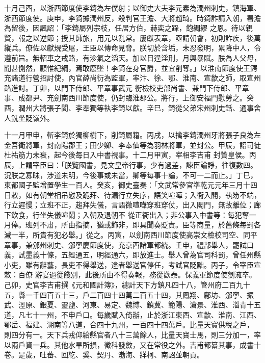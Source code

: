 \begin{pinyinscope}
 十月己酉，以浙西節度使李錡為左僕射；以御史大夫李元素為潤州刺史，鎮海軍、浙西節度使。庚申，李錡據潤州反，殺判官王澹、大將趙琦。時錡詐請入朝，署澹為留後，因諷詔：「李錡屬列宗枝，任居方伯，赫奕之跺，飽綢繆
 之恩。待以親賢，報之以逆節；授其師旅，用元以亂常。屢獻表章，亟請朝會，初則詐疾，後萬縱兵。僚佐以獻規受屠，王臣以傳命見脅。朕切於含垢，未忍發明，累降中人，令遵前旨。無軺車之戒路，有沴氣之滔天。加以日逞淫刑，月興暴賦。朕為人父母，聞甚惻然，顧惟紀綱，焉敢廢墜！李錡在身官爵，並宜削奪。」以淮南節度使王鍔充諸道行營招討使，內官薛尚衍為監軍，率汴、徐、鄂、淮南、宣歙之師，取宣州路進討。丁卯，以門下侍郎、平章事武元
 衡檢校吏部尚書、兼門下侍郎、平章事、成都尹、充劍南西川節度使，仍封臨淮郡公。將行，上御安福門慰勞之。癸酉，潤州大將張子閬、李奉獨等執李錡以獻。辛巳，錡從父弟宋州刺史銛、通事舍人銑坐貶嶺外。



 十一月甲申，斬李錡於獨柳樹下，削錡屬籍。丙戌，以擒李錡潤州牙將張子良為左金吾衛將軍，封南陽郡王；田少卿、李奉仙等為羽林將軍，並封公。甲辰，詔司徒杜祐筋力未衰，起今後每日入中書視事。十二月甲寅，宰相李吉甫
 封贊皇侯。丙辰，上謂宰臣曰：「朕覽國書，見文皇帝行事，少有過差，諫臣論諍，往復數四。況朕之寡昧，涉道未明，今後事或未當，卿等每事十論，不可一二而止。」丁巳，東都國子監增置學生一百人。癸亥，御史臺奏：「文武常參官準乾元元年三月十四日敕，如有朝堂相吊慰及跪拜、待漏行立失序，語笑喧嘩；入衙入閣，執笏不端，行立遲慢；立班不正，趨拜失儀，言語微喧嘩穿班穿仗，出入閣門，無故離位；廊下飲食，行坐失儀喧鬧；入朝及退朝不
 從正衙出入；非公事入中書等：每犯奪一月俸。班列不肅，所由指摘，猶或飾非，即具聞奏貶責。臣等商量，於舊條每罰各減一半，所貴有犯必舉。」從之。丙寅，以劍南西川節度使高崇文檢校司空、同平章事，兼邠州刺史、邠寧慶節度使，充京西諸軍都統。壬申，禮部舉人，罷試口義，試墨義十條，五經通五，明經通六，即放進士。舉人曾為官司科罰，曾任州縣小吏，雖有辭藝，長吏不得舉送，違者舉送官停任，考試官貶黜。丙子，令宰臣宣敕：百僚
 游宴過從餞別，此後所由不得奏報，務從歡泰。保義軍節度使劉澭卒。己卯，史官李吉甫撰《元和國計簿》，總計天下方鎮凡四十八，管州府二百九十五，縣一千四百五十三，戶二百四十四萬二百五十四，其鳳翔、鄜坊、邠寧、振武、涇原、銀夏、靈鹽、河東、易定、魏博、鎮冀、範陽、滄景、淮西、淄青十五道，凡七十一州，不申戶口。每歲賦入倚辦，止於浙江東西、宣歙、淮南、江西、鄂岳、福建、湖南等八道，合四十九州，一百四十四萬戶。比量天寶供稅之戶，
 則四分有一。天下兵戎仰給縣官者八十三萬餘人，比量天寶士馬，則三分加一，率以兩戶資一兵。其他水旱所損，徵科發斂，又在常役之外。吉甫都纂其事，成書十卷。是歲，吐蕃、回紇、奚、契丹、渤海、牂柯、南詔並朝貢。




\end{pinyinscope}
